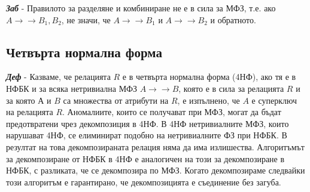 \documentclass[fleqn,12pt]{article}
\begin{document}
\textbf{\textit{Заб}} - Правилото за разделяне и комбиниране не е в сила за МФЗ, т.е. ако $A \rightarrow \rightarrow B_1, B_2$, не значи, че $A \rightarrow \rightarrow B_1$ и $A \rightarrow \rightarrow B_2$ и обратното.

\subsection{Четвърта нормална форма}

\textbf{\textit{Деф}} - Казваме, че релацията $R$ е в четвърта нормална форма (4НФ), ако тя е в НФБК и за всяка нетривиална МФЗ $A \rightarrow \rightarrow B$, която е в сила за релацията $R$ и за която $А$ и $B$ са множества от атрибути на $R$, е изпълнено, че $A$ е суперключ на релацията $R$.
\bigbreak
Аномалиите, които се получават при МФЗ, могат да бъдат предотвратени чрез декомпозиция в 4НФ.
В 4НФ нетривиалните МФЗ, които нарушават 4НФ, се елиминират подобно на нетривиалните ФЗ при НФБК.
В резултат на това декомпозираната релация няма да има излишества.
\bigbreak
Алгоритъмът за декомпозиране от НФБК в 4НФ е аналогичен на този за декомпозиране в НФБК, с разликата, че се декомпозира по МФЗ.
Когато декомпозираме следвайки този алгоритъм е гарантирано, че декомпозицията е съединение без загуба.
\end{document}
